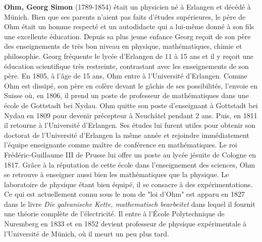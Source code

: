 \textbf{Ohm, Georg Simon} (1789-1854) était un physicien né à Erlangen et décédé à Münich. Bien que ses parents n'aient pas faits d'études supérieures, le père de Ohm était un homme respecté et un autodidacte qui a lui-même donné à son fils une excellente éducation. Depuis sa plus jeune enfance Georg reçoit de son père des enseignements de très bon niveau en physique, mathématiques, chimie et philosophie. Georg fréquente le lycée d'Erlangen de 11 à 15 ans et il y reçoit une éducation scientifique très restreinte, contrastant avec les enseignements de son père. En 1805, à l'âge de 15 ans, Ohm entre à l'Université d'Erlangen. Comme Ohm est dissipé, son père en colère devant le gâchis de ses possibilités, l'envoie en Suisse où, en 1806, il prend un poste de professeur de mathématiques dans une école de Gottstadt bei Nydau. Ohm quitte son poste d'enseignant à Gottstadt bei Nydau en 1809 pour devenir précepteur à Neuchâtel pendant 2 ans. Puis, en 1811 il retourne à l'Université d'Erlangen. Ses études lui furent utiles pour obtenir son doctorat de l'Université d'Erlangen la même année et rejoindre immédiatement l'équipe enseignante comme maître de conférence en mathématiques. Le roi Frédéric-Guillaume III de Prusse lui offre un poste au lycée jésuite de Cologne en 1817. Grâce à la réputation de cette école dans l'enseignement des sciences, Ohm se retrouve à enseigner aussi bien les mathématiques que la physique. Le laboratoire de physique étant bien équipé, il se consacre à des expérimentations. Ce qui est actuellement connu sous le nom de "loi d'Ohm" est apparu en 1827 dans le livre \textit{Die galvanische Kette, mathematisch bearbeitet} dans lequel il fournit une théorie complète de l'électricité. Il entre à l'École Polytechnique de Nuremberg en 1833 et en 1852 devient professeur de physique expérimentale à l'Université de Münich, où il meurt un peu plus tard.


